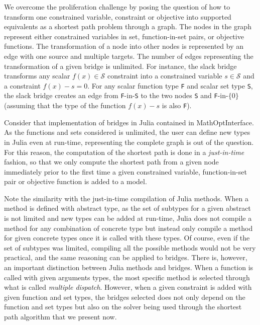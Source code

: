 \documentclass[11pt,twoside,a4paper,openright]{uclouvain-thesis}
\begin{document}
We overcome the proliferation challenge by posing the question of how to transform one constrained variable, constraint or objective into supported equivalents as a shortest path problem through a graph.
The nodes in the graph represent either constrained variables in set, function-in-set pairs, or objective functions.
The transformation of a node into other nodes is represented by an edge with one source and multiple targets.
The number of edges representing the transformation of a given bridge is unlimited.
For instance, the slack bridge transforms any scalar $f(x) \in \mathcal{S}$ constraint into a constrained variable $s \in \mathcal{S}$ and a constraint $f(x) - s = 0$.
For any scalar function type \texttt{F} and scalar set type \texttt{S}, the slack bridge creates an edge from \texttt{F}-in-\texttt{S} to the two nodes \texttt{S} and \texttt{F}-in-$\{0\}$ (assuming that the type of the function $f(x) - s$ is also \texttt{F}).

\begin{myrem}
  \label{rem:jitbridges}
  Consider that implementation of bridges in Julia contained in MathOptInterface.
As the functions and sets considered is unlimited, the user can define new types in Julia even at run-time, representing the complete graph is out of the question.
For this reason, the computation of the shortest path is done in a \textit{just-in-time} fashion, so that we only compute the shortest path from a given node immediately prior to the first time a given constrained variable, function-in-set pair or objective function is added to a model.

Note the similarity with the just-in-time compilation of Julia methods. When a method is defined with abstract type, as the set of subtypes for a given abstract is not limited and new types can be added at run-time, Julia does not compile a method for any combination of concrete type but instead only compile a method for given concrete types once it is called with these types.
Of course, even if the set of subtypes was limited, compiling all the possible methods would not be very practical, and the same reasoning can be applied to bridges.
There is, however, an important distinction between Julia methods and bridges. When a function is called with given arguments types, the most specific method is selected through what is called \emph{multiple dispatch}.
However, when a given constraint is added with given function and set types, the bridges selected does not only depend on the function and set types but also on the solver being used through the shortest path algorithm that we present now.
\end{myrem}
\end{document}
